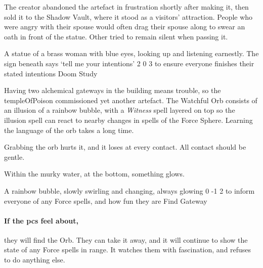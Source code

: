 \begin{multicols}{2}
\begin{exampletext}
  The creator abandoned the \gls{artefact} in frustration shortly after making it, then sold it to the Shadow Vault, where it stood as a visitors' attraction.
  People who were angry with their spouse would often drag their spouse along to swear an oath in front of the statue.
  Other tried to remain silent when passing it.
\end{exampletext}

  {A statue of a brass woman with blue eyes, looking up and listening earnestly.
  The sign beneath says `tell me your intentions'}%
  {2}%
  {0}%
  {3}%
  {to ensure everyone finishes their stated intentions}%
  {Doom Study}%
  {
    \setcounter{Fate}{2}
    \setcounter{Water}{2}
    \setcounter{Empathy}{2}
    \setcounter{Cultivation}{1}
  }%

\showStdSpells[
  \setcounter{diceNo}{0}
]


\begin{exampletext}
  Having two alchemical gateways in the building means trouble, so the \gls{templeOfPoison} commissioned yet another \gls{artefact}.
  The Watchful Orb consists of an illusion of a rainbow bubble, with a \textit{Witness} spell layered on top so the illusion spell can react to nearby changes in spells of the Force Sphere.
  Learning the language of the orb takes a long time.

  Grabbing the orb hurts it, and it loses  at every contact.
  All contact should be gentle.
\end{exampletext}

\begin{boxtext}
  Within the murky water, at the bottom, something glows.
\end{boxtext}

  {A rainbow bubble, slowly swirling and changing, always glowing}%
  {0}%
  {-1}%
  {2}%
  {to inform everyone of any Force spells, and how fun they are}%
  {Find Gateway}%
  {
    \setcounter{Air}{3}
    \setcounter{Fire}{3}
    \setcounter{Earth}{1}
    \setcounter{Academics}{2}
    \setcounter{Xenomology}{2}
  }%

\showStdSpells[
  \setcounter{enc}{2}
  \findGatewaySpell
]

\paragraph{If the \glspl{pc} feel about,}
they will find the Orb.
They can take it away, and it will continue to show the state of any Force spells in range.
It watches them with fascination, and refuses to do anything else.


\end{multicols}
